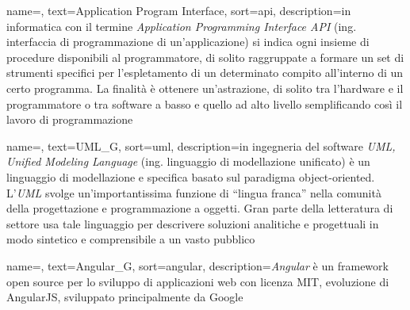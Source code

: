 
\renewcommand{\acronymname}{Acronimi e abbreviazioni}


    


{
    name=,
    text=Application Program Interface,
    sort=api,
    description={in informatica con il termine \emph{Application Programming Interface API} (ing. interfaccia di programmazione di un'applicazione) si indica ogni insieme di procedure disponibili al programmatore, di solito raggruppate a formare un set di strumenti specifici per l'espletamento di un determinato compito all'interno di un certo programma. La finalità è ottenere un'astrazione, di solito tra l'hardware e il programmatore o tra software a basso e quello ad alto livello semplificando così il lavoro di programmazione}
}

{
    name=,
    text=UML_G,
    sort=uml,
    description={in ingegneria del software \emph{UML, Unified Modeling Language} (ing. linguaggio di modellazione unificato) è un linguaggio di modellazione e specifica basato sul paradigma object-oriented. L'\emph{UML} svolge un'importantissima funzione di ``lingua franca'' nella comunità della progettazione e programmazione a oggetti. Gran parte della letteratura di settore usa tale linguaggio per descrivere soluzioni analitiche e progettuali in modo sintetico e comprensibile a un vasto pubblico}
}

{
    name=,
    text=Angular_G,
    sort=angular,
    description={\emph{Angular} è un framework open source per lo sviluppo di applicazioni web con licenza MIT, evoluzione di AngularJS, sviluppato principalmente da Google}
}

